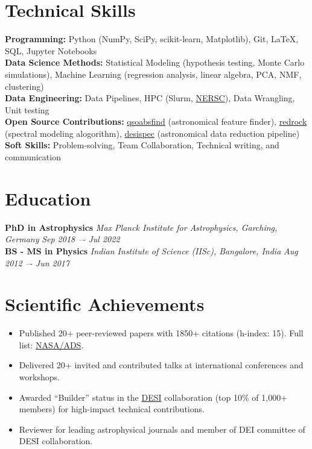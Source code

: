 \documentclass[a4paper,10pt]{article}
\begin{document}
\vspace*{-4mm}
\section*{Technical Skills}
\textcolor{sectionblue}{\textbf{Programming:}} Python (NumPy, SciPy, scikit-learn, Matplotlib), Git, LaTeX, SQL, Jupyter Notebooks \\
\textcolor{sectionblue}{\textbf{Data Science Methods:}} Statistical Modeling (hypothesis testing, Monte Carlo simulations), Machine Learning (regression analysis, linear algebra, PCA, NMF, clustering)\\
\textcolor{sectionblue}{\textbf{Data Engineering:}} Data Pipelines, HPC (Slurm, \href{https://www.nersc.gov}{NERSC}), Data Wrangling, Unit testing\\
\textcolor{sectionblue}{\textbf{Open Source Contributions:}} \href{https://github.com/abhi0395/qsoabsfind}{qsoabsfind} (astronomical feature finder), \href{https://github.com/desihub/redrock}{redrock} (spectral modeling alogorithm), \href{https://github.com/desihub/desispec}{desispec} (astronomical data reduction pipeline)\\
\textcolor{sectionblue}{\textbf{Soft Skills:}} Problem-solving, Team Collaboration, Technical writing, and communication
\vspace*{-2mm}

\section*{Education}

\textcolor{sectionblue}{\textbf{PhD in Astrophysics}} \hfill \textit{Max Planck Institute for Astrophysics, Garching, Germany} \hfill \textit{Sep 2018 –- Jul 2022}\\
\textcolor{sectionblue}{\textbf{BS - MS in Physics}} \hfill \textit{Indian Institute of Science (IISc), Bangalore, India} \hfill \textit{Aug 2012 –- Jun 2017}
\vspace*{-2mm}

\section*{Scientific Achievements}
\begin{itemize}
    \item Published 20+ peer-reviewed papers with 1850+ citations (h-index: 15). Full list: \href{https://ui.adsabs.harvard.edu/public-libraries/YPXGQEsNQg-zR9R9YBYFXw}{NASA/ADS}.
    \vspace*{-1mm}
    \item Delivered 20+ invited and contributed talks at international conferences and workshops.
    \vspace*{-1mm}
    \item Awarded “Builder” status in the \href{https://en.wikipedia.org/wiki/Dark_Energy_Spectroscopic_Instrument}{DESI} collaboration (top 10\% of 1,000+ members) for high-impact technical contributions.
    \vspace*{-1mm}
    \item Reviewer for leading astrophysical journals and member of DEI committee of DESI collaboration.
\end{itemize}
\end{document}
